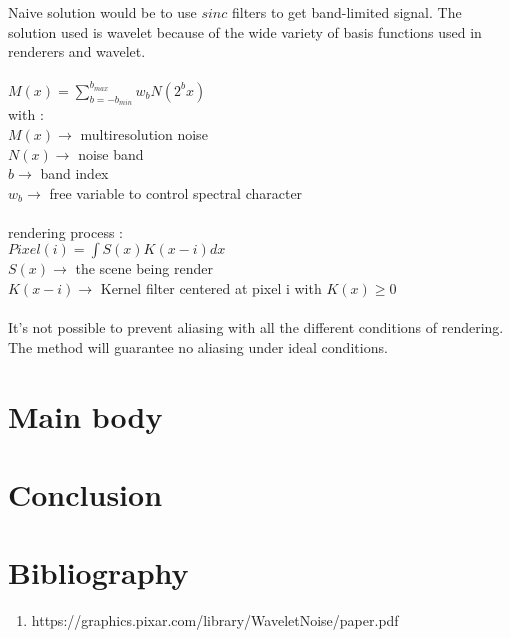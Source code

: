 \documentclass[11pt,a4paper]{article}
\begin{document}
Naive solution would be to use $sinc$ filters to get band-limited signal.
The solution used is wavelet because of the wide variety of basis functions used in renderers and wavelet.
\\\\
$M(x) = \sum\limits_{b=-b_{min}}^{b_{max}} w_{b}N(2^{b}x)$
\\
with :
\\
$M(x)\rightarrow$  multiresolution noise
\\
$N(x)\rightarrow$ noise band
\\
$b\rightarrow$ band index
\\
$w_{b}\rightarrow$ free variable to control spectral character
\\
\\
rendering process :
\\
$Pixel(i) = \int S(x)K(x-i)dx$
\\
$S(x)\rightarrow$ the scene being render
\\
$K(x-i)\rightarrow$ Kernel filter centered at pixel i with $K(x) \geq 0$ 
\\
\\
It's not possible to prevent aliasing with all the different conditions of rendering. The method will guarantee no aliasing under ideal conditions.


\section{Main body}



\section{Conclusion}



\section{Bibliography}

\begin{enumerate}
\item https://graphics.pixar.com/library/WaveletNoise/paper.pdf
\end{enumerate}
\end{document}
